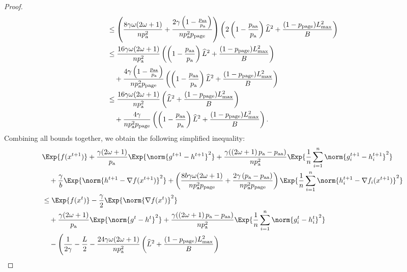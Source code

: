 \documentclass{article}
\newcommand*{\probavailable}{\ensuremath{p_{\textnormal{a}}}}
\newcommand*{\probpairaa}{\ensuremath{p_{\textnormal{aa}}}}
\newcommand*{\probpage}{\ensuremath{p_{\text{page}}}}
\begin{document}
\begin{proof}
\begin{align*}
      &\leq \left(\frac{8 \gamma \omega (2 \omega + 1)}{n \probavailable^2} + \frac{2 \gamma \left(1 - \frac{\probpairaa}{\probavailable}\right)}{n \probavailable^2 \probpage}\right) \left(2\left(1 - \frac{\probpairaa}{\probavailable}\right)\widehat{L}^2 + \frac{(1 - \probpage)L_{\max}^2}{B}\right) \\
      &\leq \frac{16 \gamma \omega (2 \omega + 1)}{n \probavailable^2} \left(\left(1 - \frac{\probpairaa}{\probavailable}\right)\widehat{L}^2 + \frac{(1 - \probpage)L_{\max}^2}{B}\right) \\
      &\quad + \frac{4 \gamma \left(1 - \frac{\probpairaa}{\probavailable}\right)}{n \probavailable^2 \probpage} \left(\left(1 - \frac{\probpairaa}{\probavailable}\right)\widehat{L}^2 + \frac{(1 - \probpage)L_{\max}^2}{B}\right) \\
      &\leq \frac{16 \gamma \omega (2 \omega + 1)}{n \probavailable^2} \left(\widehat{L}^2 + \frac{(1 - \probpage)L_{\max}^2}{B}\right) \\
      &\quad + \frac{4 \gamma}{n \probavailable^2 \probpage} \left(\left(1 - \frac{\probpairaa}{\probavailable}\right)\widehat{L}^2 + \frac{(1 - \probpage)L_{\max}^2}{B}\right).
    \end{align*}
    Combining all bounds together, we obtain the following simplified inequality:
    \begin{align*}
      &\Exp{f(x^{t + 1})} + \frac{\gamma (2 \omega + 1)}{\probavailable} \Exp{\norm{g^{t+1} - h^{t+1}}^2} + \frac{\gamma (\left(2 \omega + 1\right)\probavailable - \probpairaa)}{n \probavailable^2} \Exp{\frac{1}{n}\sum_{i=1}^n\norm{g^{t+1}_i - h^{t+1}_i}^2}\\
      &\quad  + \frac{\gamma}{b} \Exp{\norm{h^{t+1} - \nabla f(x^{t+1})}^2} + \left(\frac{8 b \gamma \omega (2 \omega + 1)}{n \probavailable^2 \probpage} + \frac{2 \gamma \left(\probavailable - \probpairaa\right)}{n \probavailable^2 \probpage}\right) \Exp{\frac{1}{n}\sum_{i=1}^n\norm{h^{t+1}_i - \nabla f_i(x^{t+1})}^2}\\
      &\leq \Exp{f(x^t)} - \frac{\gamma}{2}\Exp{\norm{\nabla f(x^t)}^2} \\
      &\quad + \frac{\gamma (2 \omega + 1)}{\probavailable} \Exp{\norm{g^{t} - h^{t}}^2} + \frac{\gamma (\left(2 \omega + 1\right)\probavailable - \probpairaa)}{n \probavailable^2} \Exp{\frac{1}{n}\sum_{i=1}^n\norm{g^{t}_i - h^{t}_i}^2} \\
      &\quad - \Bigg(\frac{1}{2\gamma} - \frac{L}{2} - \frac{24 \gamma \omega (2 \omega + 1)}{n \probavailable^2} \left(\widehat{L}^2 + \frac{(1 - \probpage)L_{\max}^2}{B}\right) \\

\end{align*}
\end{proof}
\end{document}

